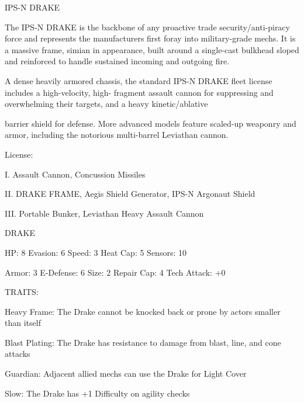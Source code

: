                                                                                                                                  
                                                    IPS-N DRAKE  

The IPS-N DRAKE is the backbone of any proactive trade security/anti-piracy force and represents the  
manufacturers first foray into military-grade mechs. It is a massive frame, simian in appearance, built  
around a single-cast bulkhead sloped and reinforced to handle sustained incoming and outgoing fire.    

A dense heavily armored chassis, the standard IPS-N DRAKE fleet license includes a high-velocity, high- 
fragment assault cannon for suppressing and overwhelming their targets, and a heavy kinetic/ablative  

barrier shield for defense. More advanced models feature scaled-up weaponry and armor, including the  
notorious multi-barrel Leviathan cannon.  

                                                                                                                           


                                                     License:
 
I. Assault Cannon, Concussion Missiles
 
II. DRAKE FRAME, Aegis Shield Generator, IPS-N Argonaut Shield
 
III. Portable Bunker, Leviathan Heavy Assault Cannon
 

                                                     DRAKE 

  HP: 8           Evasion: 6                             Speed: 3            Heat Cap: 5        Sensors: 10 

  Armor: 3        E-Defense: 6                           Size: 2             Repair Cap: 4      Tech Attack:  
                                                                                                +0 

                                                     TRAITS: 

  Heavy Frame: The Drake cannot be knocked back or prone by actors smaller than itself
 
  Blast Plating: The Drake has resistance to damage from blast, line, and cone attacks
 
  Guardian: Adjacent allied mechs can use the Drake for Light Cover
 
  Slow: The Drake has +1 Difficulty on agility checks 

